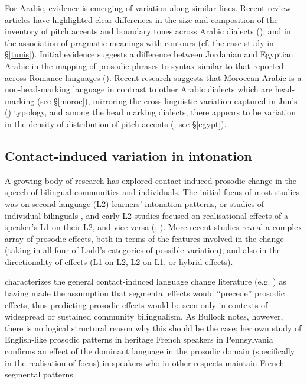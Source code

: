 \documentclass[output=paper]{langsci/langscibook}
\begin{document}
For Arabic, evidence is emerging of variation along similar lines. Recent review articles have highlighted clear differences in the size and composition of the inventory of pitch accents and boundary tones across Arabic dialects (\citealt{Chahal2011,ElZarka2017}), and in the association of pragmatic meanings with contours (cf. the case study in §\ref{tunis}). Initial evidence suggests a difference between Jordanian and Egyptian Arabic in the mapping of prosodic phrases to syntax \citep{Hellmuth2016} similar to that reported across Romance languages (\citealt{Dimperioetal2005}). Recent research suggests that Moroccan Arabic is a non-head-marking language in contrast to other Arabic dialects which are head-marking (see §\ref{moroc}), mirroring the cross-linguistic variation captured in Jun's (\citeyear{Jun2005}) typology, and among the head marking dialects, there appears to be variation in the density of distribution  of pitch accents (\citealt{ChahalHellmuth2015}; see §\ref{egypt}).


 
 \subsection{Contact-induced variation in intonation} \label{var}


A growing body of research has explored contact-induced prosodic change in the speech of bilingual communities and individuals. The initial focus of most studies was on second-language (L2) learners’ intonation patterns, or studies of individual bilinguals \citep{Queen2012}, and early L2 studies focused on realisational effects of a speaker’s L1 on their L2, and vice versa (\citealt{AttererLadd2004}; \citealt{Mennen2004}). More recent studies reveal a complex array of prosodic effects, both in terms of the features involved in the change (taking in all four of Ladd’s categories of possible variation), and also in the directionality of effects (L1 on L2, L2 on L1, or hybrid effects). 

\citet{Bullock2009} characterizes the general contact-induced language change literature (e.g. \citealt{WeinreichLabovHerzog1968,ThomasonKaufman1988}) as having made the assumption that segmental effects would ``precede'' prosodic effects, thus predicting prosodic effects would be seen only in contexts of widespread or sustained community bilingualism. As Bullock notes, however, there is no logical structural reason why this should be the case; her own study of English-like prosodic patterns in heritage French speakers in Pennsylvania confirms an effect of the dominant language in the prosodic domain (specifically in the realisation of focus) in speakers who in other respects maintain French segmental patterns.
\end{document}
